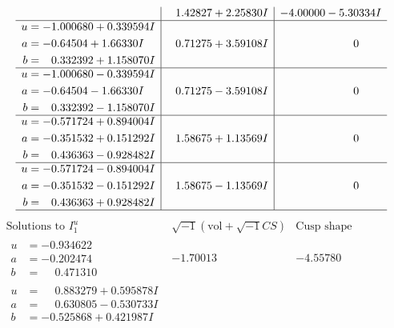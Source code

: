 \documentclass[1p]{elsarticle_modified}
\theoremstyle{definition}
\newcommand{\I}{\sqrt{-1}}
\begin{document}
$$\begin{array}{c|c|c}
 & \phantom{-}1.42827 + 2.25830 I & -4.00000 - 5.30334 I \\ \hline\begin{aligned}
u &= -1.000680 + 0.339594 I \\
a &= -0.64504 + 1.66330 I \\
b &= \phantom{-}0.332392 + 1.158070 I\end{aligned}
 & \phantom{-}0.71275 + 3.59108 I & \phantom{-0.000000 } 0 \\ \hline\begin{aligned}
u &= -1.000680 - 0.339594 I \\
a &= -0.64504 - 1.66330 I \\
b &= \phantom{-}0.332392 - 1.158070 I\end{aligned}
 & \phantom{-}0.71275 - 3.59108 I & \phantom{-0.000000 } 0 \\ \hline\begin{aligned}
u &= -0.571724 + 0.894004 I \\
a &= -0.351532 + 0.151292 I \\
b &= \phantom{-}0.436363 - 0.928482 I\end{aligned}
 & \phantom{-}1.58675 + 1.13569 I & \phantom{-0.000000 } 0 \\ \hline\begin{aligned}
u &= -0.571724 - 0.894004 I \\
a &= -0.351532 - 0.151292 I \\
b &= \phantom{-}0.436363 + 0.928482 I\end{aligned}
 & \phantom{-}1.58675 - 1.13569 I & \phantom{-0.000000 } 0\\
 \hline 
 \end{array}$$\newpage$$\begin{array}{c|c|c}  
\text{Solutions to }I^u_{1}& \I (\text{vol} + \sqrt{-1}CS) & \text{Cusp shape}\\
 \hline 
\begin{aligned}
u &= -0.934622\phantom{ +0.000000I} \\
a &= -0.202474\phantom{ +0.000000I} \\
b &= \phantom{-}0.471310\phantom{ +0.000000I}\end{aligned}
 & -1.70013\phantom{ +0.000000I} & -4.55780\phantom{ +0.000000I} \\ \hline\begin{aligned}
u &= \phantom{-}0.883279 + 0.595878 I \\
a &= \phantom{-}0.630805 - 0.530733 I \\
b &= -0.525868 + 0.421987 I\end{aligned}

\end{array}$$
\end{document}
